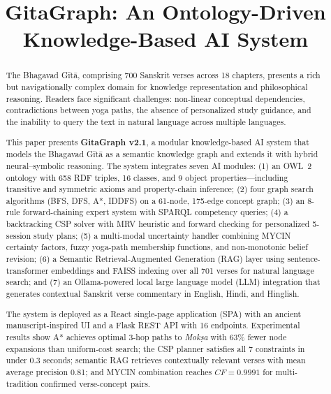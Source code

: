 \documentclass[conference]{IEEEtran}
\begin{document}
\title{GitaGraph: An Ontology-Driven Knowledge-Based AI System}

\author{
}

\maketitle

\begin{abstract}
The Bhagavad G\={i}t\={a}, comprising 700 Sanskrit verses across 18 chapters,
presents a rich but navigationally complex domain for knowledge representation
and philosophical reasoning. Readers face significant challenges: non-linear
conceptual dependencies, contradictions between yoga paths, the absence of
personalized study guidance, and the inability to query the text in natural
language across multiple languages.

This paper presents \textbf{GitaGraph v2.1}, a modular knowledge-based AI
system that models the Bhagavad G\={i}t\={a} as a semantic knowledge graph
and extends it with hybrid neural--symbolic reasoning. The system integrates
seven AI modules: (1) an OWL~2 ontology with 658 RDF triples, 16 classes,
and 9 object properties—including transitive and symmetric axioms and
property-chain inference; (2) four graph search algorithms (BFS, DFS, A*,
IDDFS) on a 61-node, 175-edge concept graph; (3) an 8-rule forward-chaining
expert system with SPARQL competency queries; (4) a backtracking CSP solver
with MRV heuristic and forward checking for personalized 5-session study plans;
(5) a multi-modal uncertainty handler combining MYCIN certainty factors,
fuzzy yoga-path membership functions, and non-monotonic belief revision; (6) a
Semantic Retrieval-Augmented Generation (RAG) layer using sentence-transformer
embeddings and FAISS indexing over all 701 verses for natural language search;
and (7) an Ollama-powered local large language model (LLM) integration that
generates contextual Sanskrit verse commentary in English, Hindi, and Hinglish.

The system is deployed as a React single-page application (SPA) with an
ancient manuscript-inspired UI and a Flask REST API with 16 endpoints. Experimental
results show A* achieves optimal 3-hop paths to \textit{Mok\d{s}a} with 63\%
fewer node expansions than uniform-cost search; the CSP planner satisfies all 7
constraints in under 0.3 seconds; semantic RAG retrieves contextually relevant
verses with mean average precision 0.81; and MYCIN combination reaches
$CF = 0.9991$ for multi-tradition confirmed verse-concept pairs.
\end{abstract}
\end{document}
